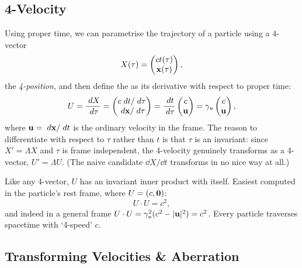 \documentclass[a4paper]{scrartcl}
\begin{document}
\subsection{4-Velocity}

Using proper time, we can parametrise the trajectory of a particle using a $4$-vector
$$
X(\tau) = \begin{pmatrix}
	ct(\tau) \\
	\mathbf{x}(\tau)
\end{pmatrix},
$$
the \emph{4-position}, and then define the  as its derivative with respect to proper time:
$$
U = \frac{\; d X}{\; d \tau} = \begin{pmatrix}
	c \; d t/\; d\tau \\
	\; d \mathbf{x} / \; d \tau
\end{pmatrix}
= \frac{\; d t}{\; d\tau} \begin{pmatrix}
	c \\ \mathbf{u}
\end{pmatrix} = \gamma_u \begin{pmatrix}
	c \\ \mathbf{u}
\end{pmatrix},
$$
where $\mathbf{u} = \; d \mathbf{x}/ \; d t$ is the ordinary velocity in the frame. The reason to differentiate with respect to $\tau$ rather than $t$ is that $\tau$ is an invariant: since $X' = \Lambda X$ and $\tau$ is frame independent, the 4-velocity genuinely transforms as a 4-vector, $U' = \Lambda U$. (The naive candidate $\dd X/\dd t$ transforms in no nice way at all.)

Like any 4-vector, $U$ has an invariant inner product with itself. Easiest computed in the particle's rest frame, where $U = (c, \mathbf{0})$:
$$
U \cdot U = c^2,
$$
and indeed in a general frame $U \cdot U = \gamma_u^2 (c^2 - |\mathbf{u}|^2) = c^2$. Every particle traverses spacetime with `4-speed' $c$.

\subsection{Transforming Velocities \& Aberration}
\end{document}
